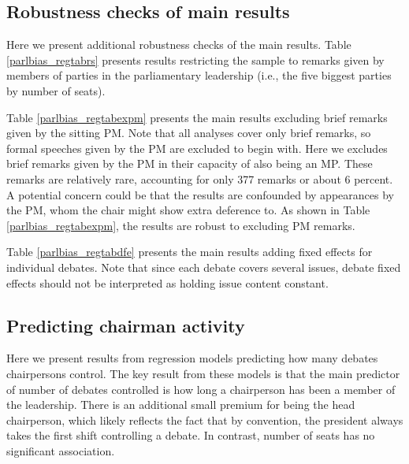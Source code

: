 \documentclass[12pt,a4paper]{article}
\begin{document}
\subsection{Robustness checks of main results}\label{approbust}

Here we present additional robustness checks of the main results. Table \ref{parlbias_regtabrs} presents results restricting the sample to remarks given by members of parties in the parliamentary leadership (i.e., the five biggest parties by number of seats).



Table \ref{parlbias_regtabexpm} presents the main results excluding brief remarks given by the sitting PM. Note that all analyses cover only brief remarks, so formal speeches given by the PM are excluded to begin with. Here we excludes brief remarks given by the PM in their capacity of also being an MP. These remarks are relatively rare, accounting for only 377 remarks or about 6 percent. A potential concern could be that the results are confounded by appearances by the PM, whom the chair might show extra deference to. As shown in Table \ref{parlbias_regtabexpm}, the results are robust to excluding PM remarks.



Table \ref{parlbias_regtabdfe} presents the main results adding fixed effects for individual debates. Note that since each debate covers several issues, debate fixed effects should not be interpreted as holding issue content constant.



\clearpage

\subsection{Predicting chairman activity}\label{appact}

Here we present results from regression models predicting how many debates chairpersons control. The key result from these models is that the main predictor of number of debates controlled is how long a chairperson has been a member of the leadership. There is an additional small premium for being the head chairperson, which likely reflects the fact that by convention, the president always takes the first shift controlling a debate. In contrast, number of seats has no significant association.


\end{document}

